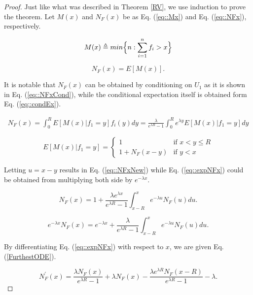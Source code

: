 \documentclass[12pt, draftclsnofoot, onecolumn]{IEEEtran}
\begin{document}
\begin{proof}
Just like what was described in Theorem \ref{RV}, we use induction 
to prove the theorem. Let $M(x)$ and $N_F(x)$ be as Eq. (\ref{eq::Mx})
and Eq. (\ref{eq::NFx}), respectively. 

\begin{equation}
\label{eq::Mx}
M(x) \triangleq min  \Bigl\{ n:\sum_{i=1}^{n}f_i>x  \Bigr\}
\end{equation}

\begin{equation}
\label{eq::NFx}
N_F(x)=E[M(x)].
\end{equation}

It is notable that $N_F(x)$ can be obtained by conditioning on $U_{1}$ 
as it is shown in Eq. (\ref{eq::NFxCond}), while the conditional 
expectation itself is obtained form Eq. (\ref{eq::condEx}).

\begin{multline}
\label{eq::NFxCond}
	N_F(x)= \int_{0}^{R} E[M(x)|f_1=y] f_{i} (y) dy =  
		\frac{\lambda}{e^{\lambda R}-1} \int_{0}^{R} e^{\lambda y} E[M(x)|f_1=y] dy
\end{multline}


\begin{equation}
\label{eq::condEx}
	E[M(x)|f_1=y] = 
	\left\{
		\begin{array}{ll}
			1  & \mbox{if } x < y \leq R \\
			1 + N_F(x-y) & \mbox{if } y < x
		\end{array}
	\right.
\end{equation}

Letting $u=x-y$ results in Eq. (\ref{eq::NFxNew}) while 
Eq. (\ref{eq::expNFx}) could be obtained from multiplying 
both side by $e^{-\lambda x}$.

\begin{equation}
\label{eq::NFxNew}
	N_F(x)=  1+ \frac{\lambda e^{\lambda x}}{e^{\lambda R}-1} \int_{x-R}^{x} e^{-\lambda u} N_F(u) du.
\end{equation}

\begin{equation}
\label{eq::expNFx}
	 e^{-\lambda x} N_F(x)=  e^{-\lambda x}+ \frac{\lambda}{e^{\lambda R}-1} \int_{x-R}^{x} e^{-\lambda u} N_F(u) du.
\end{equation}


By differentiating Eq. (\ref{eq::expNFx}) with respect to $x$, we are given 
Eq. (\ref{FurthestODE}).

\begin{equation}
\label{FurthestODE}
	N_F^{\prime}(x)= \frac{\lambda N_F(x)}{e^{\lambda R}-1} + \lambda N_F(x) - \frac{\lambda e^{\lambda R} N_F(x-R)}{e^{\lambda R}-1} - \lambda.
\end{equation}


\end{proof}
\end{document}
